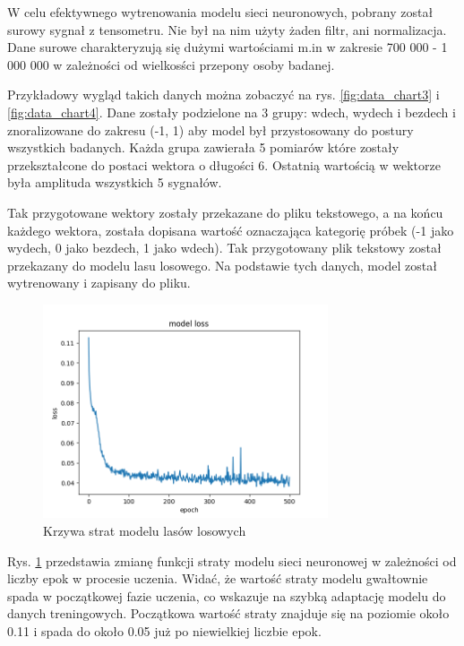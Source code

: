 \documentclass{article}
\begin{document}
W celu efektywnego wytrenowania modelu sieci neuronowych, pobrany został surowy sygnał z tensometru. Nie był na nim użyty żaden filtr, ani normalizacja. Dane surowe charakteryzują się dużymi wartościami m.in w zakresie 700 000 - 1 000 000 w zależności od wielkosści przepony osoby badanej. 

Przykładowy wygląd takich danych można zobaczyć na rys. \ref{fig:data_chart3} i \ref{fig:data_chart4}. Dane zostały podzielone na 3 grupy: wdech, wydech i bezdech i znoralizowane do zakresu (-1, 1) aby model był przystosowany do postury wszystkich badanych. Każda grupa zawierała 5 pomiarów które zostały przekształcone do postaci wektora o długości 6. Ostatnią wartością w wektorze była amplituda wszystkich 5 sygnałów. 

Tak przygotowane wektory zostały przekazane do pliku tekstowego, a na końcu każdego wektora, została dopisana wartość oznaczająca kategorię próbek (-1 jako wydech, 0 jako bezdech, 1 jako wdech). Tak przygotowany plik tekstowy został przekazany do modelu lasu losowego. Na podstawie tych danych, model został wytrenowany i zapisany do pliku.

\begin{figure}[H]
    \centering
    \includegraphics[width=0.75\textwidth]{las_losowy/epoch_loss_forest.png}
    \caption{Krzywa strat modelu lasów losowych}
    \label{fig:data_chart2}
\end{figure}

Rys. \ref{fig:data_chart2} przedstawia zmianę funkcji straty modelu sieci neuronowej w zależności od liczby epok w procesie uczenia. Widać, że wartość straty modelu gwałtownie spada w początkowej fazie uczenia, co wskazuje na szybką adaptację modelu do danych treningowych. Początkowa wartość straty znajduje się na poziomie około 0.11 i spada do około 0.05 już po niewielkiej liczbie epok.
\end{document}

